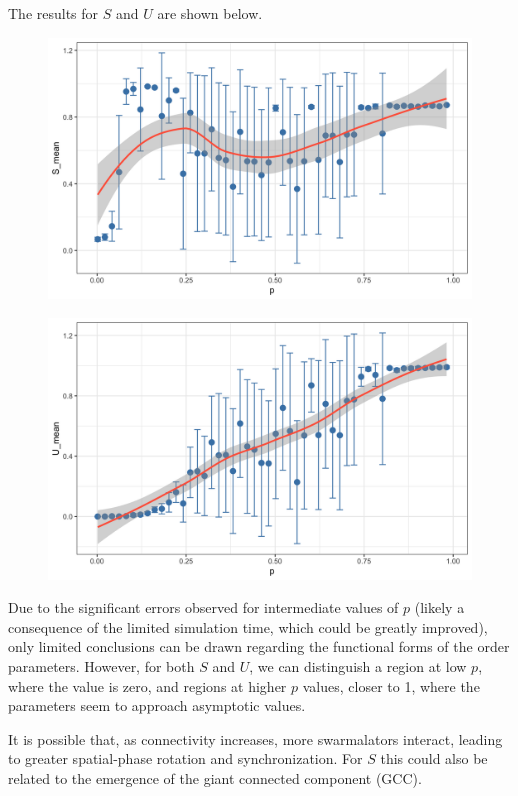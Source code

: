 
The results for $S$ and $U$ are shown below.

\begin{figure}[h]
    \centering
    \begin{minipage}[c]{0.8\textwidth}
        \includegraphics[width=\textwidth]{images/task20-appendix/S_K=-0.6,J=0.9.png}
    \end{minipage}
    \label{fig:S}
\end{figure}

\begin{figure}[h]
    \centering
    \begin{minipage}[c]{0.8\textwidth}
        \includegraphics[width=\textwidth]{images/task20-appendix/U_K=-0.6,J=0.9.png}
    \end{minipage}
    \label{fig:U}
\end{figure}

Due to the significant errors observed for intermediate values of $p$ (likely a consequence of the limited simulation time, which could be greatly improved), only limited conclusions can be drawn regarding the functional forms of the order parameters. However, for both $S$ and $U$, we can distinguish a region at low $p$, where the value is zero, and regions at higher $p$ values, closer to 1, where the parameters seem to approach asymptotic values. 

It is possible that, as connectivity increases, more swarmalators interact, leading to greater spatial-phase rotation and synchronization. For $S$ this could also be related to the emergence of the giant connected component (GCC).



